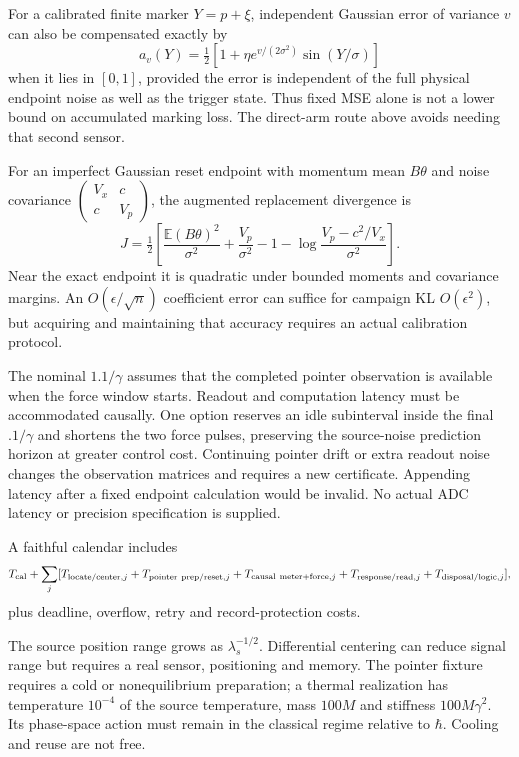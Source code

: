 \documentclass[11pt,a4paper]{article}
\newcommand{\E}{\mathbb E}\newcommand{\Prb}{\mathbb P}
\begin{document}
For a calibrated finite marker $Y=p+\xi$, independent Gaussian error of variance $v$ can also be compensated exactly by
\[
 a_v(Y)=\tfrac12[1+\eta e^{v/(2\sigma^2)}\sin(Y/\sigma)]
\]
when it lies in $[0,1]$, provided the error is independent of the full physical endpoint noise as well as the trigger state. Thus fixed MSE alone is not a lower bound on accumulated marking loss. The direct-arm route above avoids needing that second sensor.

For an imperfect Gaussian reset endpoint with momentum mean $B\theta$ and noise covariance $\left(\begin{smallmatrix}V_x&c\\c&V_p\end{smallmatrix}\right)$, the augmented replacement divergence is
\[
 J=\tfrac12\left[
 \frac{\E(B\theta)^2}{\sigma^2}+\frac{V_p}{\sigma^2}-1
 -\log\frac{V_p-c^2/V_x}{\sigma^2}\right].
\]
Near the exact endpoint it is quadratic under bounded moments and covariance margins. An $O(\epsilon/\sqrt n)$ coefficient error can suffice for campaign KL $O(\epsilon^2)$, but acquiring and maintaining that accuracy requires an actual calibration protocol.

The nominal $1.1/\gamma$ assumes that the completed pointer observation is available when the force window starts. Readout and computation latency must be accommodated causally. One option reserves an idle subinterval inside the final $.1/\gamma$ and shortens the two force pulses, preserving the source-noise prediction horizon at greater control cost. Continuing pointer drift or extra readout noise changes the observation matrices and requires a new certificate. Appending latency after a fixed endpoint calculation would be invalid. No actual ADC latency or precision specification is supplied.

A faithful calendar includes
\[
 T_{\rm cal}+\sum_j[
 T_{{\rm locate/center},j}+T_{{\rm pointer\ prep/reset},j}
 +T_{{\rm causal\ meter+force},j}+T_{{\rm response/read},j}
 +T_{{\rm disposal/logic},j}],
\]
plus deadline, overflow, retry and record-protection costs.

The source position range grows as $\lambda_s^{-1/2}$. Differential centering can reduce signal range but requires a real sensor, positioning and memory. The pointer fixture requires a cold or nonequilibrium preparation; a thermal realization has temperature $10^{-4}$ of the source temperature, mass $100M$ and stiffness $100M\gamma^2$. Its phase-space action must remain in the classical regime relative to $\hbar$. Cooling and reuse are not free.
\end{document}
